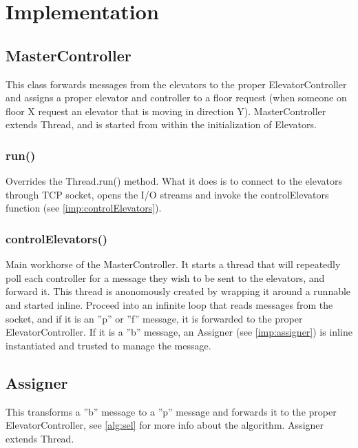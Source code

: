 \section{Implementation}

\subsection{MasterController}
This class forwards messages from the elevators to the proper ElevatorController and assigns a proper elevator and controller to a floor request (when someone on floor X request an elevator that is moving in direction Y). MasterController extends Thread, and is started from within the initialization of Elevators.

\subsubsection{run()}
Overrides the Thread.run() method. What it does is to connect to the elevators through TCP socket, opens the I/O streams and invoke the controlElevators function (see \cref{imp:controlElevators}).

\subsubsection{controlElevators()}
Main workhorse of the MasterController. It starts a thread that will repeatedly poll each controller for a message they wish to be sent to the elevators, and forward it. This thread is anonomously created by wrapping it around a runnable and started inline. Proceed into an infinite loop that reads messages from the socket, and if it is an ''p'' or ''f'' message, it is forwarded to the proper ElevatorController. If it is a ''b'' message, an Assigner (see \cref{imp:assigner}) is inline instantiated and trusted to manage the message.

\subsection{Assigner}
This transforms a ''b'' message to a ''p'' message and forwards it to the proper ElevatorController, see \cref{alg:sel} for more info about the algorithm.\newline
Assigner extends Thread.

